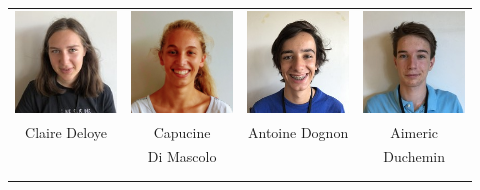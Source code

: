 \begin{center}
\begin{tabular}{cccc}
\includegraphics[angle=270,origin=c, width=27mm]{eleves/Deloye Claire.JPG} &
\includegraphics[angle=0,origin=c, width=27mm]{eleves/Di Mascolo Capucine.JPG} &
\includegraphics[angle=270,origin=c, width=27mm]{eleves/Dognon Antoine.JPG} &
\includegraphics[angle=270,origin=c, width=27mm]{eleves/Duchemin Aimeric.JPG} \\
Claire Deloye & Capucine & Antoine Dognon & Aimeric \\ & Di Mascolo & & Duchemin \\ \\ \\ 


\end{tabular}
\end{center}
